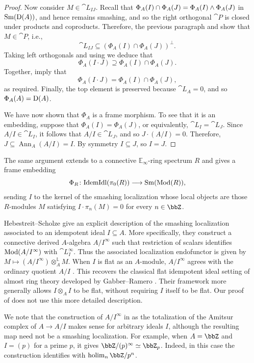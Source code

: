 \documentclass{amsart}
\begin{document}
\begin{proof}
    Now consider $M \in \cat L_{IJ}$. Recall that $\Phi_A(I) \cap \Phi_A(J) = \Phi_A(I) \land \Phi_A(J)$ in $\operatorname{Sm}(\operatorname{D}(A))$, and hence remains smashing, and so the right orthogonal $\cat P$ is closed under products and coproducts. Therefore, the previous paragraph and  show that $M \in \cat P$, i.e., 
    \[
    \cat L_{IJ} \subseteq (\Phi_A(I) \cap \Phi_A(J))^{\perp}.
    \]
    Taking left orthogonals and using  we deduce that 
  \begin{equation}\label{eq:inclusion-2}
    \Phi_A(I \cdot J) \supseteq \Phi_A(I) \cap \Phi_A(J).
    \end{equation}
    Together,  imply that 
    \[
        \Phi_A(I \cdot J) = \Phi_A(I) \cap \Phi_A(J),
    \]
    as required. Finally, the top element is preserved because $\cat L_A = 0$, and so $\Phi_A(A) = \operatorname{D}(A)$. 

    We have now shown that $\Phi_A$ is a frame morphism. To see that it is an embedding, suppose that $\Phi_A(I) = \Phi_A(J)$, or equivalently, $\cat L_I = \cat L_J$. Since $A/I \in \cat L_I$, it follows that $A/I \in \cat L_J$, and so $J \cdot (A/I) = 0$. Therefore, $J \subseteq \operatorname{Ann}_A(A/I)=I$. By symmetry $I \subseteq J$, so $I = J$. 
    \end{proof}
    \begin{Rem}
    The same argument extends to a connective $\mathbb E_\infty$-ring spectrum $R$ and gives a frame embedding
    \[
        \Phi_R \colon \mathrm{IdemIdl}(\pi_0(R)) \longrightarrow \operatorname{Sm}(\operatorname{Mod}(R)),
    \]
    sending $I$ to the kernel of the smashing localization whose local objects are those $R$-modules $M$ satisfying $I \cdot \pi_n(M) = 0$ for every $n \in \bbZ$.
\end{Rem}
    \begin{Rem}
        Hebestreit--Scholze \cite{hebestreit2024note} give an explicit description of the smashing localization associated to an idempotent ideal $I \subseteq A$. More specifically, they construct a connective derived $A$-algebra $A/I^\infty$ such that restriction of scalars identifies $\operatorname{Mod}(A/I^\infty)$ with $\cat L_I^\infty$. Thus the associated localization endofunctor is given by $M \longmapsto (A/I^\infty) \otimes_A^{\mathbb L} M$. When $I$ is flat as an $A$-module, $A/I^\infty$ agrees with the ordinary quotient $A/I$ \cite[Remark 4(4)]{hebestreit2024note}. This recovers the classical flat idempotent ideal setting of almost ring theory developed by Gabber--Ramero \cite[Section 2.1.1 and Remark 2.1.4(i)]{GabberRamero2003Almost}. Their framework more generally allows $I \otimes_A I$ to be flat, without requiring $I$ itself to be flat. Our proof of  does not use this more detailed description.

        We note that the construction of $A/I^\infty$ in \cite{hebestreit2024note} as the totalization of the Amitsur complex of $A \to A/I$ makes sense for arbitrary ideals $I$, although the resulting map need not be a smashing localization. For example, when $A = \bbZ$ and $I = (p)$ for a prime $p$, it gives $\bbZ/(p)^\infty \simeq \bbZ_p$. Indeed, in this case the construction identifies with $\operatorname{holim}_n \bbZ/p^n$.
    \end{Rem}
\end{document}
